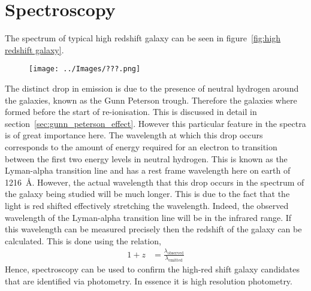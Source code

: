 \section{Spectroscopy} %
\label{sec:spectroscopy}
	The spectrum of typical high redshift galaxy can be seen in figure~\ref{fig:high redshift galaxy}.
	\begin{figure}[ht]
		\centering
			\texttt{[image: ../Images/???.png]}
		\caption{\label{fig:high_redshift_galaxy_spectrum}}
	\end{figure}

	The distinct drop in emission is due to the presence of neutral hydrogen around the galaxies, known as the Gunn Peterson trough. Therefore the galaxies where formed before the start of re-ionisation. This is discussed in detail in section~\ref{sec:gunn_peterson_effect}. However this particular feature in the spectra is of great importance here. The wavelength at which this drop occurs corresponds to the amount of energy required for an electron to transition between the first two energy levels in neutral hydrogen. This is known as the Lyman-alpha transition line and has a rest frame wavelength here on earth of \SI{1216}{\angstrom}. However, the actual wavelength that this drop occurs in the spectrum of the galaxy being studied will be much longer. This is due to the fact that the light is red shifted effectively stretching the wavelength. Indeed, the observed wavelength of the Lyman-alpha transition line will be in the infrared range. If this wavelength can be measured precisely then the redshift of the galaxy can be calculated. This is done using the relation,
	\begin{align}
		1+z &= \frac{\lambda_{\text{observed}}}{\lambda_{\text{emitted}}}
	\end{align}
	Hence, spectroscopy can be used to confirm the high-red shift galaxy candidates that are identified via photometry. In essence it is high resolution photometry.

